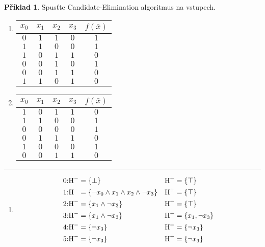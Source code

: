 \documentclass[a4paper]{article}
\theoremstyle{definition}
\newtheorem{priklad}{Příklad}
\newcommand{\vperp}{\rotatebox[origin=c]{-180}{$\perp$}}
\begin{document}
\begin{priklad}
    Spusťte Candidate-Elimination algoritmus na vstupech.
    
    \begin{enumerate}
      \item 
          \begin{tabular}{*{4}{c}|c}
          \hline
           $ x_0 $ & $ x_1 $ & $ x_2 $ & $ x_3 $ & $ f(\bar{x}) $ \\
           \hline
           $ 0 $ & $ 1 $ & $ 1 $ & $ 0 $ & $ 1 $ \\
           $ 1 $ & $ 1 $ & $ 0 $ & $ 0 $ & $ 1 $ \\
           $ 1 $ & $ 0 $ & $ 1 $ & $ 1 $ & $ 0 $ \\
           $ 0 $ & $ 0 $ & $ 1 $ & $ 0 $ & $ 1 $ \\
           $ 0 $ & $ 0 $ & $ 1 $ & $ 1 $ & $ 0 $ \\
           $ 1 $ & $ 1 $ & $ 0 $ & $ 1 $ & $ 0 $ \\
           \hline
          \end{tabular}
      \item 
          \begin{tabular}{*{4}{c}|c}
          \hline
           $ x_0 $ & $ x_1 $ & $ x_2 $ & $ x_3 $ & $ f(\bar{x}) $ \\
           \hline
           $ 1 $ & $ 0 $ & $ 1 $ & $ 1 $ & $ 0 $ \\
           $ 1 $ & $ 1 $ & $ 0 $ & $ 0 $ & $ 1 $ \\
           $ 0 $ & $ 0 $ & $ 0 $ & $ 0 $ & $ 1 $ \\
           $ 0 $ & $ 1 $ & $ 1 $ & $ 1 $ & $ 0 $ \\
           $ 1 $ & $ 0 $ & $ 0 $ & $ 0 $ & $ 1 $ \\
           $ 0 $ & $ 0 $ & $ 1 $ & $ 1 $ & $ 0 $ \\
           \hline
          \end{tabular}
    \end{enumerate}    
\noindent\rule{\linewidth}{.2pt}  
\begin{enumerate}
  \item 
  \begin{align*}
    0{:} & \text{H}^- = \{ \perp \} & \text{H}^+ &= \{ \vperp \} \\
    1{:} & \text{H}^- = \{ \neg x_0 \wedge x_1 \wedge x_2 \wedge \neg x_3 \} & \text{H}^+ &= \{ \vperp \} \\
    2{:} & \text{H}^- = \{ x_1 \wedge \neg x_3 \} & \text{H}^+ &= \{ \vperp \} \\
    3{:} & \text{H}^- = \{ x_1 \wedge \neg x_3 \} & \text{H}^+ &= \{ x_1, \neg x_3 \} \\    
    4{:} & \text{H}^- = \{ \neg x_3 \} & \text{H}^+ &= \{ \neg x_3 \} \\
    5{:} & \text{H}^- = \{ \neg x_3 \} & \text{H}^+ &= \{ \neg x_3 \} \\
  \end{align*}
\end{enumerate}  
\end{priklad}
\end{document}
